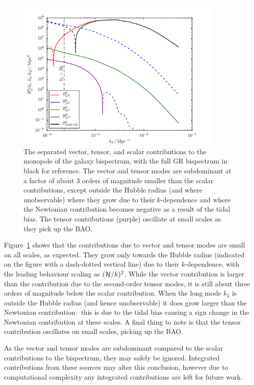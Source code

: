 \begin{figure}[ht]
	\centering
	\includegraphics[width=0.9\textwidth]{fig/vectortensor_monopole.pdf}
	\caption{The separated vector, tensor, and scalar contributions to the monopole of the galaxy bispectrum, with the full GR bispectrum in black for reference. The vector and tensor modes are subdominant at a factor of about 3 orders of magnitude smaller than the scalar contributions, except outside the Hubble radius (and where unobservable) where they grow due to their $k$-dependence and where the Newtonian contribution becomes negative as a result of the tidal bias. The tensor contributions (purple) oscillate at small scales as they pick up the BAO.}
	\label{fig:monopolevectortensor}
\end{figure}

Figure~\ref{fig:monopolevectortensor} shows that the contributions due to vector and tensor modes are small on all scales, as expected. They grow only towards the Hubble radius (indicated on the figure with a dash-dotted vertical line) due to their $k$-dependence, with the leading behaviour scaling as $(\mathcal{H}/k)^2$. While the vector contribution is larger than the contribution due to the second-order tensor modes, it is still about three orders of magnitude below the scalar contribution. When the long mode $k_3$ is outside the Hubble radius (and hence unobservable) it does grow larger than the Newtonian contribution-- this is due to the tidal bias causing a sign change in the Newtonian contribution at these scales. A final thing to note is that the tensor contribution oscillates on small scales, picking up the BAO. 

As the vector and tensor modes are subdominant compared to the scalar contributions to the bispectrum, they may safely be ignored. Integrated contributions from these sources may alter this conclusion, however due to computational complexity any integrated contributions are left for future work. 



